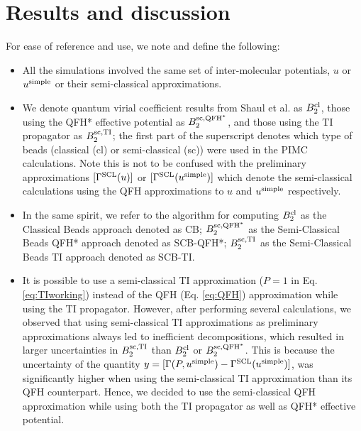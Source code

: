 \section{Results and discussion}
    For ease of reference and use, we note and define the following:
    \begin{itemize}
        \item All the simulations involved the same set of inter-molecular potentials, $u$ or $u^{\rm simple}$ or their semi-classical approximations.
        \item We denote quantum virial coefficient results from Shaul et al. \cite{Shaul2012} as $B_2^{\rm cl}$, those using the QFH* effective potential as $B_2^{\rm sc,QFH^*}$, and those using the TI propagator as $B_2^{\rm sc,TI}$; the first part of the superscript denotes which type of beads (classical (cl) or semi-classical (sc)) were used in the PIMC calculations. Note this is not to be confused with the preliminary approximations $[\Gamma^{\rm SCL} (u)]$ or $[\Gamma^{\rm SCL} (u^{\rm simple})]$ which denote the semi-classical calculations using the QFH approximations to $u$ and $u^{\rm simple}$ respectively.
        \item In the same spirit, we refer to the algorithm for computing $B_2^{\rm cl}$ as the Classical Beads approach denoted as CB; $B_2^{\rm sc,QFH^*}$ as the Semi-Classical Beads QFH* approach denoted as SCB-QFH*; $B_2^{\rm sc,TI}$ as the Semi-Classical Beads TI approach denoted as SCB-TI.
        \item It is possible to use a semi-classical TI approximation ($P = 1$ in Eq. \eqref{eq:TIworking}) instead of the QFH (Eq. \eqref{eq:QFH}) approximation while using the TI propagator. However, after performing several calculations, we observed that using semi-classical TI approximations as preliminary approximations always led to inefficient decompositions, which resulted in larger uncertainties in $B_2^{\rm sc,TI}$ than $B_2^{\rm cl}$ or $B_2^{\rm sc,QFH^*}$. This is because the uncertainty of the quantity $y = [\Gamma (P, u^{\rm simple}) - \Gamma^{\rm SCL} (u^{\rm simple})]$, was significantly higher when using the semi-classical TI approximation than its QFH counterpart. Hence, we decided to use the semi-classical QFH approximation while using both the TI propagator as well as QFH* effective potential.
    \end{itemize}

